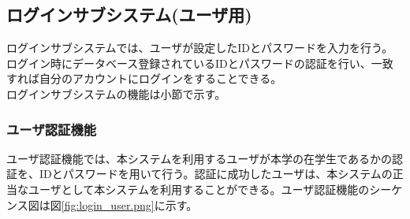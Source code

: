 \documentclass[a4j]{jarticle}
\begin{document}
  \subsection{ログインサブシステム(ユーザ用)}
  ログインサブシステムでは、ユーザが設定したIDとパスワードを入力を行う。ログイン時にデータベース登録されているIDとパスワードの認証を行い、一致すれば自分のアカウントにログインをすることできる。\\
  ログインサブシステムの機能は小節で示す。
  \subsubsection{ユーザ認証機能}
  ユーザ認証機能では、本システムを利用するユーザが本学の在学生であるかの認証を、IDとパスワードを用いて行う。認証に成功したユーザは、本システムの正当なユーザとして本システムを利用することができる。ユーザ認証機能のシーケンス図は図\ref{fig:login_user.png}に示す。
\end{document}
